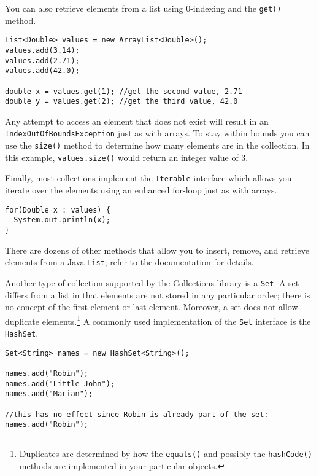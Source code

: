 You can also retrieve elements from a list using 0-indexing and
the \texttt{get()} method. 

\begin{verbatim}
List<Double> values = new ArrayList<Double>();
values.add(3.14);
values.add(2.71);
values.add(42.0);

double x = values.get(1); //get the second value, 2.71
double y = values.get(2); //get the third value, 42.0
\end{verbatim}

Any attempt to access an element that does not exist will
result in an \texttt{IndexOutOfBoundsException} just as 
with arrays.  To stay within bounds you can use the \texttt{size()}
method to determine how many elements are in the collection.
In this example, \texttt{values.size()} would return an 
integer value of 3.

Finally, most collections implement the \texttt{Iterable}
interface which allows you iterate over the elements using an 
enhanced for-loop just as with arrays.

\begin{verbatim}
for(Double x : values) {
  System.out.println(x);
}
\end{verbatim}

There are dozens of other methods that allow you to insert, remove, and
retrieve elements from a Java \texttt{List}; refer to the documentation
for details.

Another type of collection supported by the Collections library is a 
\texttt{Set}.  A set differs from a list in that elements are not
stored in any particular order; there is no concept of the first element
or last element.  Moreover, a set does not allow duplicate elements.\footnote{Duplicates
are determined by how the \texttt{equals()} and possibly the
\texttt{hashCode()} methods are implemented in your particular
objects.}  A commonly used implementation of the \texttt{Set}
interface is the \texttt{HashSet}.  

\begin{verbatim}
Set<String> names = new HashSet<String>();

names.add("Robin");
names.add("Little John");
names.add("Marian");

//this has no effect since Robin is already part of the set:
names.add("Robin");
\end{verbatim}

